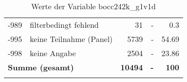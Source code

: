 \begin{longtable}{Xlrrr}
       -989 & filterbedingt fehlend & \num{31} & - & \num[round-mode=places,round-precision=2]{0.3} \\

       -995 & keine Teilnahme (Panel) & \num{5739} & - & \num[round-mode=places,round-precision=2]{54.69} \\

       -998 & keine Angabe & \num{2504} & - & \num[round-mode=places,round-precision=2]{23.86} \\

     \midrule
     \multicolumn{2}{l}{\textbf{Summe (gesamt)}} & \textbf{\num{10494}} & \textbf{-} & \textbf{\num{100}} \\
     \bottomrule
     \caption{Werte der Variable bocc242k\_g1v1d}
     \end{longtable}
     
